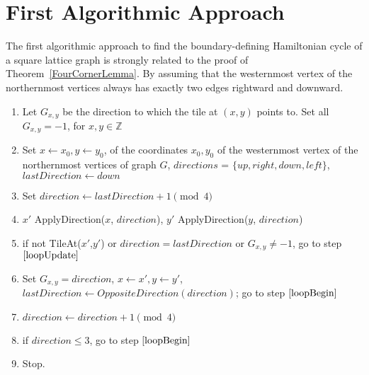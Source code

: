 \section{First Algorithmic Approach}
The first algorithmic approach to find the boundary-defining Hamiltonian cycle of a square lattice graph is strongly related to the proof of Theorem~\ref{FourCornerLemma}. By assuming that the westernmost vertex of the northernmost vertices always has exactly two edges rightward and downward. 
\begin{enumerate}[1.]
\item Let $G_{x,y}$ be the direction to which the tile at $(x,y)$ points to. Set all $G_{x,y}=-1$, for $x,y \in \mathbb{Z}$
\item Set $x\gets x_0, y\gets y_0$, of the coordinates $x_0,y_0$ of the westernmost vertex of the northernmost vertices of graph $G$, $directions$ = $\{up,right,down,left\}$, $lastDirection\gets down$
\item \label{loopBegin} Set $direction \gets lastDirection+1 \pmod{4}$
\item $x'$ \gets ApplyDirection($x$, $direction$), $y'$ \gets ApplyDirection($y$, $direction$)
\item if not TileAt($x'$,$y'$) or $direction = lastDirection$ or $G_{x,y}\ne -1$, go to step $\ref{loopUpdate}$
\item Set $G_{x,y} = direction$, $x \gets x', y \gets y'$, $lastDirection \gets OppositeDirection(direction)$; go to step $\ref{loopBegin}$
\item \label{loopUpdate} $direction \gets direction+1 \pmod{4}$
\item if $direction\leq 3$, go to step $\ref{loopBegin}$
\item Stop.
\end{enumerate}